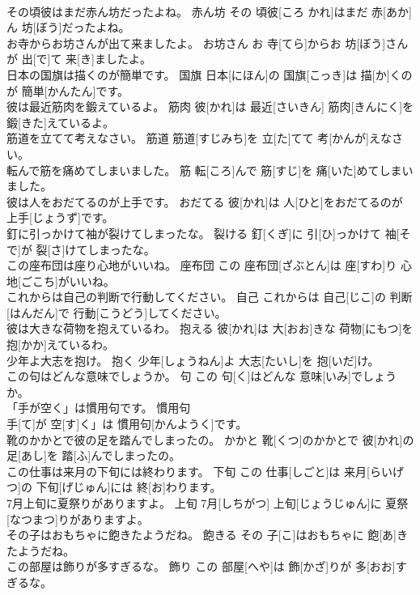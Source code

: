 \documentclass[8pt]{extreport}
\begin{document}
\begin{CJK}{UTF8}{min}
\\	その頃彼はまだ赤ん坊だったよね。	赤ん坊	その 頃彼[ころ かれ]はまだ 赤[あか]ん 坊[ぼう]だったよね。	
\\	お寺からお坊さんが出て来ましたよ。	お坊さん	お 寺[てら]からお 坊[ぼう]さんが 出[で]て 来[き]ましたよ。	
\\	日本の国旗は描くのが簡単です。	国旗	日本[にほん]の 国旗[こっき]は 描[か]くのが 簡単[かんたん]です。	
\\	彼は最近筋肉を鍛えているよ。	筋肉	彼[かれ]は 最近[さいきん] 筋肉[きんにく]を 鍛[きた]えているよ。	
\\	筋道を立てて考えなさい。	筋道	筋道[すじみち]を 立[た]てて 考[かんが]えなさい。	
\\	転んで筋を痛めてしまいました。	筋	転[ころ]んで 筋[すじ]を 痛[いた]めてしまいました。	
\\	彼は人をおだてるのが上手です。	おだてる	彼[かれ]は 人[ひと]をおだてるのが 上手[じょうず]です。	
\\	釘に引っかけて袖が裂けてしまったな。	裂ける	釘[くぎ]に 引[ひ]っかけて 袖[そで]が 裂[さ]けてしまったな。	
\\	この座布団は座り心地がいいね。	座布団	この 座布団[ざぶとん]は 座[すわ]り 心地[ごこち]がいいね。	
\\	これからは自己の判断で行動してください。	自己	これからは 自己[じこ]の 判断[はんだん]で 行動[こうどう]してください。	
\\	彼は大きな荷物を抱えているわ。	抱える	彼[かれ]は 大[おお]きな 荷物[にもつ]を 抱[かか]えているわ。	
\\	少年よ大志を抱け。	抱く	少年[しょうねん]よ 大志[たいし]を 抱[いだ]け。	
\\	この句はどんな意味でしょうか。	句	この 句[く]はどんな 意味[いみ]でしょうか。	
\\	「手が空く」は慣用句です。	慣用句	
\\	手[て]が 空[す]く」は 慣用句[かんようく]です。	
\\	靴のかかとで彼の足を踏んでしまったの。	かかと	靴[くつ]のかかとで 彼[かれ]の 足[あし]を 踏[ふ]んでしまったの。	
\\	この仕事は来月の下旬には終わります。	下旬	この 仕事[しごと]は 来月[らいげつ]の 下旬[げじゅん]には 終[お]わります。	
\\	7月上旬に夏祭りがありますよ。	上旬	7月[しちがつ] 上旬[じょうじゅん]に 夏祭[なつまつ]りがありますよ。	
\\	その子はおもちゃに飽きたようだね。	飽きる	その 子[こ]はおもちゃに 飽[あ]きたようだね。	
\\	この部屋は飾りが多すぎるな。	飾り	この 部屋[へや]は 飾[かざ]りが 多[おお]すぎるな。	

\end{CJK}
\end{document}
